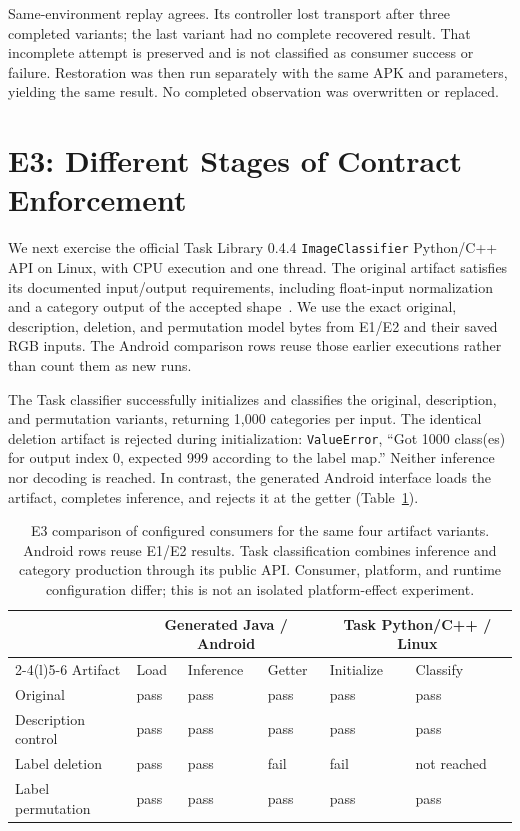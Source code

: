 \documentclass[10pt,twocolumn,letterpaper]{article}
\newcommand{\code}[1]{\texttt{#1}}
\begin{document}
Same-environment replay agrees. Its controller lost transport after three completed variants; the last variant had no complete recovered result. That incomplete attempt is preserved and is not classified as consumer success or failure. Restoration was then run separately with the same APK and parameters, yielding the same result. No completed observation was overwritten or replaced.

\section{E3: Different Stages of Contract Enforcement}
\label{sec:e3}
We next exercise the official Task Library 0.4.4 \code{ImageClassifier} Python/C++ API on Linux, with CPU execution and one thread. The original artifact satisfies its documented input/output requirements, including float-input normalization and a category output of the accepted shape~\cite{task-classifier}. We use the exact original, description, deletion, and permutation model bytes from E1/E2 and their saved RGB inputs. The Android comparison rows reuse those earlier executions rather than count them as new runs.

The Task classifier successfully initializes and classifies the original, description, and permutation variants, returning 1,000 categories per input. The identical deletion artifact is rejected during initialization: \code{ValueError}, ``Got 1000 class(es) for output index 0, expected 999 according to the label map.'' Neither inference nor decoding is reached. In contrast, the generated Android interface loads the artifact, completes inference, and rejects it at the getter (Table~\ref{tab:stages}).

\begin{table}[t]
\centering\small
\setlength{\tabcolsep}{8pt}
\begin{tabular}{@{}llllll@{}}
\toprule
 & \multicolumn{3}{c}{Generated Java / Android} & \multicolumn{2}{c}{Task Python/C++ / Linux}\\
\cmidrule(lr){2-4}\cmidrule(l){5-6}
Artifact & Load & Inference & Getter & Initialize & Classify\\
\midrule
Original & pass & pass & pass & pass & pass\\
Description control & pass & pass & pass & pass & pass\\
Label deletion & pass & pass & fail & fail & not reached\\
Label permutation & pass & pass & pass & pass & pass\\
\bottomrule
\end{tabular}
\caption{E3 comparison of configured consumers for the same four artifact variants. Android rows reuse E1/E2 results. Task classification combines inference and category production through its public API. Consumer, platform, and runtime configuration differ; this is not an isolated platform-effect experiment.}
\label{tab:stages}
\end{table}
\end{document}
